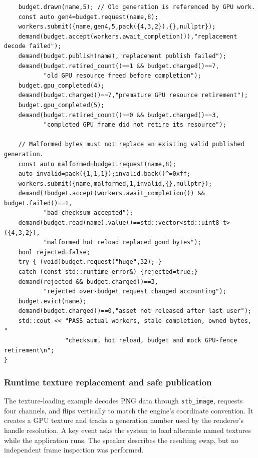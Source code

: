 \begin{verbatim}
    budget.drawn(name,5); // Old generation is referenced by GPU work.
    const auto gen4=budget.request(name,8);
    workers.submit({name,gen4,5,pack({4,3,2}),{},nullptr});
    demand(budget.accept(workers.await_completion()),"replacement decode failed");
    demand(budget.publish(name),"replacement publish failed");
    demand(budget.retired_count()==1 && budget.charged()==7,
           "old GPU resource freed before completion");
    budget.gpu_completed(4);
    demand(budget.charged()==7,"premature GPU resource retirement");
    budget.gpu_completed(5);
    demand(budget.retired_count()==0 && budget.charged()==3,
           "completed GPU frame did not retire its resource");

    // Malformed bytes must not replace an existing valid published generation.
    const auto malformed=budget.request(name,8);
    auto invalid=pack({1,1,1});invalid.back()^=0xff;
    workers.submit({name,malformed,1,invalid,{},nullptr});
    demand(!budget.accept(workers.await_completion()) && budget.failed()==1,
           "bad checksum accepted");
    demand(budget.read(name).value()==std::vector<std::uint8_t>({4,3,2}),
           "malformed hot reload replaced good bytes");
    bool rejected=false;
    try { (void)budget.request("huge",32); }
    catch (const std::runtime_error&) {rejected=true;}
    demand(rejected && budget.charged()==3,
           "rejected over-budget request changed accounting");
    budget.evict(name);
    demand(budget.charged()==0,"asset not released after last user");
    std::cout << "PASS actual workers, stale completion, owned bytes, "
                 "checksum, hot reload, budget and mock GPU-fence retirement\n";
}
\end{verbatim}

\subsubsection{Runtime texture replacement and safe publication}\label{06-engine-ii-ch027-runtime-texture-replacement-and-safe-publication}

The texture-loading example decodes PNG data through \texttt{stb\_image}, requests four channels, and flips vertically to match the engine's coordinate convention. It creates a GPU texture and tracks a generation number used by the renderer's handle resolution. A key event asks the system to load alternate named textures while the application runs. The speaker describes the resulting swap, but no independent frame inspection was performed.

